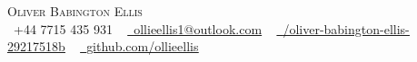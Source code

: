 \documentclass[letterpaper,11pt]{article}
\newcommand{\resumeSubHeadingListStart}{\begin{itemize}[leftmargin=0.0in, label={}]}
\newcommand{\resumeSubHeadingListEnd}{\end{itemize}}
\begin{document}

\begin{center}
    {\Huge \scshape Oliver Babington Ellis} \\ \vspace{1pt}
    \vspace{3mm}  %
    \small \raisebox{-0.1\height}\faPhone\ +44 7715 435 931 ~ \href{mailto:ollieellis1@outlook.com}{\raisebox{-0.2\height}\faEnvelope\  \underline{ollieellis1@outlook.com}} ~ 
    \href{https://www.linkedin.com/in/oliver-babington-ellis-29217518b/}{\raisebox{-0.2\height}\faLinkedin\ \underline{/oliver-babington-ellis-29217518b}}  ~
    \href{https://github.com/ollieellis}{\raisebox{-0.2\height}\faGithub\ \underline{github.com/ollieellis}}
    \vspace{-8pt}
\end{center}

\end{document}

